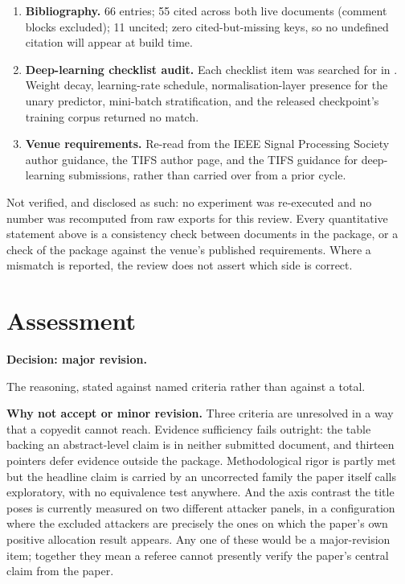 \documentclass[11pt,a4paper]{article}
\newcommand{\file}[1]{\path{#1}}
\begin{document}
\begin{enumerate}
  by \verb||.
\item \textbf{Bibliography.} 66 entries; 55 cited across both live documents
  (comment blocks excluded); 11 uncited; zero cited-but-missing keys, so no
  undefined citation will appear at build time.
\item \textbf{Deep-learning checklist audit.} Each checklist item was searched
  for in \file{supplementary.tex}. Weight decay, learning-rate schedule,
  normalisation-layer presence for the unary predictor, mini-batch
  stratification, and the released checkpoint's training corpus returned no
  match.
\item \textbf{Venue requirements.} Re-read from the IEEE Signal Processing
  Society author guidance, the TIFS author page, and the TIFS guidance for
  deep-learning submissions, rather than carried over from a prior cycle.
\end{enumerate}

Not verified, and disclosed as such: no experiment was re-executed and no
number was recomputed from raw exports for this review. Every quantitative
statement above is a consistency check between documents in the package, or a
check of the package against the venue's published requirements. Where a
mismatch is reported, the review does not assert which side is correct.

\section{Assessment}
\label{sec:assessment}

\textbf{Decision: major revision.}

The reasoning, stated against named criteria rather than against a total.

\textbf{Why not accept or minor revision.} Three criteria are unresolved in a
way that a copyedit cannot reach. Evidence sufficiency fails outright: the
table backing an abstract-level claim is in neither submitted document, and
thirteen pointers defer evidence outside the package. Methodological rigor is
partly met but the headline claim is carried by an uncorrected family the paper
itself calls exploratory, with no equivalence test anywhere. And the axis
contrast the title poses is currently measured on two different attacker
panels, in a configuration where the excluded attackers are precisely the ones
on which the paper's own positive allocation result appears. Any one of these
would be a major-revision item; together they mean a referee cannot presently
verify the paper's central claim from the paper.
\end{document}
